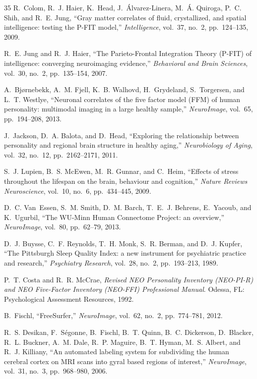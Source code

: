 \begin{thebibliography}{35}
R.~Colom, R.~J. Haier, K.~Head, J.~{\'A}lvarez-Linera, M.~{\'A}. Quiroga, P.~C. Shih, and R.~E. Jung,
``Gray matter correlates of fluid, crystallized, and spatial intelligence: testing the P-FIT model,''
\textit{Intelligence}, vol.~37, no.~2, pp.~124--135, 2009.

R.~E. Jung and R.~J. Haier,
``The Parieto-Frontal Integration Theory (P-FIT) of intelligence: converging neuroimaging evidence,''
\textit{Behavioral and Brain Sciences}, vol.~30, no.~2, pp.~135--154, 2007.

A.~Bj{\o}rnebekk, A.~M. Fjell, K.~B. Walhovd, H.~Grydeland, S.~Torgersen, and L.~T. Westlye,
``Neuronal correlates of the five factor model (FFM) of human personality: multimodal imaging in a large healthy sample,''
\textit{NeuroImage}, vol.~65, pp.~194--208, 2013.

J.~Jackson, D.~A. Balota, and D.~Head,
``Exploring the relationship between personality and regional brain structure in healthy aging,''
\textit{Neurobiology of Aging}, vol.~32, no.~12, pp.~2162--2171, 2011.

S.~J. Lupien, B.~S. McEwen, M.~R. Gunnar, and C.~Heim,
``Effects of stress throughout the lifespan on the brain, behaviour and cognition,''
\textit{Nature Reviews Neuroscience}, vol.~10, no.~6, pp.~434--445, 2009.

D.~C. Van~Essen, S.~M. Smith, D.~M. Barch, T.~E.~J. Behrens, E.~Yacoub, and K.~Ugurbil,
``The WU-Minn Human Connectome Project: an overview,''
\textit{NeuroImage}, vol.~80, pp.~62--79, 2013.

D.~J. Buysse, C.~F. Reynolds, T.~H. Monk, S.~R. Berman, and D.~J. Kupfer,
``The Pittsburgh Sleep Quality Index: a new instrument for psychiatric practice and research,''
\textit{Psychiatry Research}, vol.~28, no.~2, pp.~193--213, 1989.

P.~T. Costa and R.~R. McCrae,
\textit{Revised NEO Personality Inventory (NEO-PI-R) and NEO Five-Factor Inventory (NEO-FFI) Professional Manual}.
Odessa, FL: Psychological Assessment Resources, 1992.

B.~Fischl,
``FreeSurfer,''
\textit{NeuroImage}, vol.~62, no.~2, pp.~774--781, 2012.

R.~S. Desikan, F.~S{\'e}gonne, B.~Fischl, B.~T. Quinn, B.~C. Dickerson, D.~Blacker, R.~L. Buckner, A.~M. Dale, R.~P. Maguire, B.~T. Hyman, M.~S. Albert, and R.~J. Killiany,
``An automated labeling system for subdividing the human cerebral cortex on MRI scans into gyral based regions of interest,''
\textit{NeuroImage}, vol.~31, no.~3, pp.~968--980, 2006.


\end{thebibliography}
